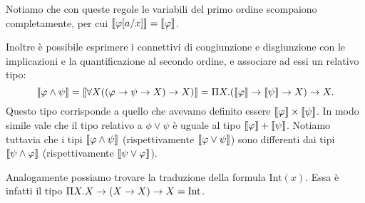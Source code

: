 \documentclass[]{marticle}
\begin{document}
Notiamo che con queste regole le variabili del primo ordine scompaiono
completamente, per cui $\llbracket \varphi[a/x] \rrbracket=\llbracket \varphi \rrbracket$.

Inoltre \`e possibile esprimere i connettivi di congiunzione e disgiunzione con
le implicazioni e la quantificazione al secondo ordine, e associare ad essi un
relativo tipo:
\[
    \llbracket \varphi\land\psi \rrbracket=\llbracket \forall X((\varphi\rightarrow\psi\rightarrow X)\rightarrow X) \rrbracket = \Pi X
    .(\llbracket \varphi \rrbracket\rightarrow\llbracket \psi \rrbracket \rightarrow X)\rightarrow X.
\]
Questo tipo corrisponde a quello che avevamo definito essere $\llbracket \varphi \rrbracket \times
\llbracket \psi \rrbracket$. In modo simile vale che il tipo relativo a $\phi \lor \psi$ \`e
uguale al tipo $\llbracket \varphi \rrbracket+\llbracket \psi \rrbracket$. Notiamo tuttavia che i tipi $\llbracket 
\varphi\land\psi \rrbracket$ (rispettivamente $\llbracket \varphi\lor\psi \rrbracket$) sono differenti dai tipi
$\llbracket  \psi\land\varphi \rrbracket$ (rispettivamente $\llbracket \psi\lor\varphi \rrbracket$).

Analogamente possiamo trovare la traduzione della formula $\text{Int}(x)$. Essa
\`e infatti il tipo $\Pi X. X\rightarrow(X\rightarrow X)\rightarrow X = \text{Int}$.
\end{document}
